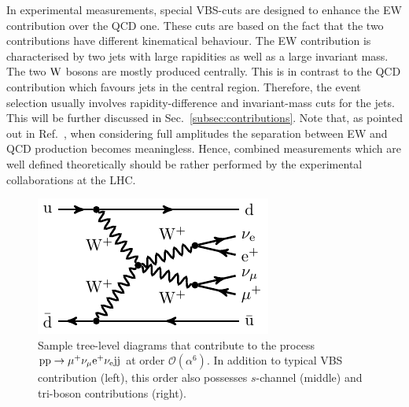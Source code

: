In experimental measurements, special VBS-cuts are designed to enhance the EW contribution over the QCD one.
These cuts are based on the fact that the two contributions have different kinematical behaviour.
The EW contribution is characterised by two jets with large rapidities as well as a large invariant mass.
The two $\text{W}$ bosons are mostly produced centrally.
This is in contrast to the QCD contribution which favours jets in the central region.
Therefore, the event selection usually involves rapidity-difference and invariant-mass cuts for the jets.
This will be further discussed in Sec.~\ref{subsec:contributions}.
Note that, as pointed out in Ref.~\cite{Biedermann:2017bss}, when considering full amplitudes the separation between EW and QCD production becomes meaningless.
Hence, combined measurements which are well defined theoretically should be rather performed by the experimental collaborations at the LHC.


\begin{figure}[t]
\begin{center}
          \includegraphics[width=0.30\linewidth]{feynman/LO_EW_5}
\end{center}
        \caption{Sample tree-level diagrams that contribute to the process $\text{p}\text{p}\to\mu^+\nu_\mu\text{e}^+\nu_{\text{e}}\text{j}\text{j}$ at order $\mathcal{O}{\left(\alpha^{6}\right)}$.
        In addition to typical VBS contribution (left), this order also possesses $s$-channel (middle) and tri-boson contributions (right). }
\label{diag:LO}
\end{figure}

